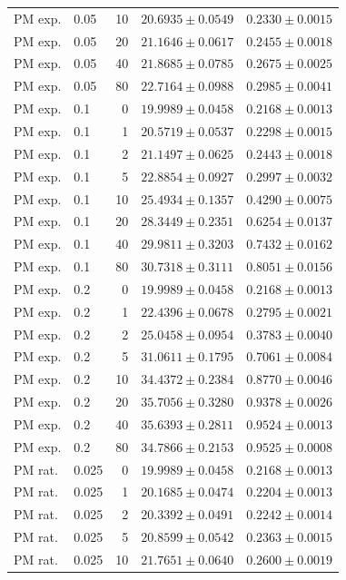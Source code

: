 \begin{longtable}{llrll}
PM exp. & 0.05 & 10 & $20.6935 \pm 0.0549$ & $0.2330 \pm 0.0015$ \\
PM exp. & 0.05 & 20 & $21.1646 \pm 0.0617$ & $0.2455 \pm 0.0018$ \\
PM exp. & 0.05 & 40 & $21.8685 \pm 0.0785$ & $0.2675 \pm 0.0025$ \\
PM exp. & 0.05 & 80 & $22.7164 \pm 0.0988$ & $0.2985 \pm 0.0041$ \\
PM exp. & 0.1 & 0 & $19.9989 \pm 0.0458$ & $0.2168 \pm 0.0013$ \\
PM exp. & 0.1 & 1 & $20.5719 \pm 0.0537$ & $0.2298 \pm 0.0015$ \\
PM exp. & 0.1 & 2 & $21.1497 \pm 0.0625$ & $0.2443 \pm 0.0018$ \\
PM exp. & 0.1 & 5 & $22.8854 \pm 0.0927$ & $0.2997 \pm 0.0032$ \\
PM exp. & 0.1 & 10 & $25.4934 \pm 0.1357$ & $0.4290 \pm 0.0075$ \\
PM exp. & 0.1 & 20 & $28.3449 \pm 0.2351$ & $0.6254 \pm 0.0137$ \\
PM exp. & 0.1 & 40 & $29.9811 \pm 0.3203$ & $0.7432 \pm 0.0162$ \\
PM exp. & 0.1 & 80 & $30.7318 \pm 0.3111$ & $0.8051 \pm 0.0156$ \\
PM exp. & 0.2 & 0 & $19.9989 \pm 0.0458$ & $0.2168 \pm 0.0013$ \\
PM exp. & 0.2 & 1 & $22.4396 \pm 0.0678$ & $0.2795 \pm 0.0021$ \\
PM exp. & 0.2 & 2 & $25.0458 \pm 0.0954$ & $0.3783 \pm 0.0040$ \\
PM exp. & 0.2 & 5 & $31.0611 \pm 0.1795$ & $0.7061 \pm 0.0084$ \\
PM exp. & 0.2 & 10 & $34.4372 \pm 0.2384$ & $0.8770 \pm 0.0046$ \\
PM exp. & 0.2 & 20 & $35.7056 \pm 0.3280$ & $0.9378 \pm 0.0026$ \\
PM exp. & 0.2 & 40 & $35.6393 \pm 0.2811$ & $0.9524 \pm 0.0013$ \\
PM exp. & 0.2 & 80 & $34.7866 \pm 0.2153$ & $0.9525 \pm 0.0008$ \\
PM rat. & 0.025 & 0 & $19.9989 \pm 0.0458$ & $0.2168 \pm 0.0013$ \\
PM rat. & 0.025 & 1 & $20.1685 \pm 0.0474$ & $0.2204 \pm 0.0013$ \\
PM rat. & 0.025 & 2 & $20.3392 \pm 0.0491$ & $0.2242 \pm 0.0014$ \\
PM rat. & 0.025 & 5 & $20.8599 \pm 0.0542$ & $0.2363 \pm 0.0015$ \\
PM rat. & 0.025 & 10 & $21.7651 \pm 0.0640$ & $0.2600 \pm 0.0019$ \\

\end{longtable}

